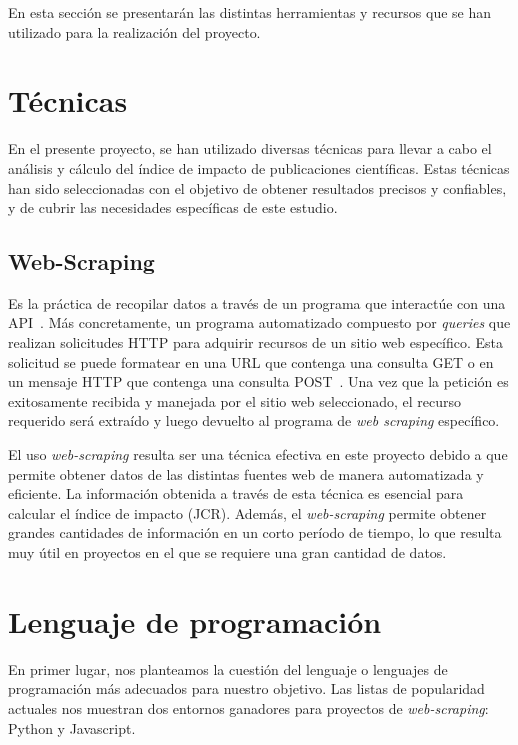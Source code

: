 
En esta sección se presentarán las distintas herramientas y recursos que se han utilizado para la realización del proyecto. 


\section{Técnicas}
En el presente proyecto, se han utilizado diversas técnicas para llevar a cabo el análisis y cálculo del índice de impacto de publicaciones científicas. Estas técnicas han sido seleccionadas con el objetivo de obtener resultados precisos y confiables, y de cubrir las necesidades específicas de este estudio.

\subsection{Web-Scraping}
Es la práctica de recopilar datos a través de un programa que interactúe con una API~\cite{mitchell2018}. Más concretamente, un programa automatizado compuesto por \textit{queries} que realizan solicitudes HTTP para adquirir recursos de un sitio web específico. Esta solicitud se puede formatear en una URL que contenga una consulta GET o en un mensaje HTTP que contenga una consulta POST~\cite{zhao2017}. Una vez que la petición es exitosamente recibida y manejada por el sitio web seleccionado, el recurso requerido será extraído y luego devuelto al programa de \textit{web scraping} específico.

El uso \textit{web-scraping} resulta ser una técnica efectiva en este proyecto debido a que permite obtener datos de las distintas fuentes web de manera automatizada y eficiente. La información obtenida a través de esta técnica es esencial para calcular el índice de impacto (JCR). Además, el \textit{web-scraping} permite obtener grandes cantidades de información en un corto período de tiempo, lo que resulta muy útil en proyectos en el que se requiere una gran cantidad de datos.


\section{Lenguaje de programación}
En primer lugar, nos planteamos la cuestión del lenguaje o lenguajes de programación más adecuados para nuestro objetivo. Las listas de popularidad actuales nos muestran dos entornos ganadores para proyectos de \textit{web-scraping}: Python y Javascript.

